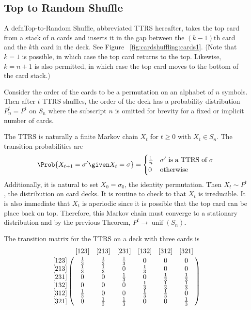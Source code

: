 \documentclass[12pt]{article}
\begin{document}
\subsection*{Top to Random Shuffle}

A defn{Top-to-Random Shuffle},%
abbreviated TTRS hereafter, takes the top card from a stack of \( n \)
cards and inserts it in the gap between the \( (k-1) \)th card and the \(
k \)th card in the deck.  See Figure~%
\ref{fig:cardshuffling:cards1}. (Note that \( k = 1 \) is possible, in
which case the top card returns to the top.  Likewise, \( k = n+1 \) is
also permitted, in which case the top card moves to the bottom of the
card stack.)

Consider the order of the cards to be a permutation on an alphabet of \(
n \) symbols.  Then after \( t \) TTRS shuffles, the order of the deck
has a probability distribution \( P^t_n = P^t \) on \( S_n \) where the
subscript \( n \) is omitted for brevity for a fixed or implicit number
of cards.

The TTRS is naturally a finite Markov chain \( X_t \) for \( t \ge 0 \)
with \( X_t \in S_n \).  The transition probabilities are
\[
    \Prob{X_{t+1} = \sigma' \given X_t = \sigma} =
    \begin{cases}
        \frac{1}{n}     & \text{\( \sigma' \) is a TTRS of \( \sigma \)}\\
        0       & \text{otherwise}
    \end{cases}
\] Additionally, it is natural to set \( X_0 = \sigma_0 \), the identity
permutation.  Then \( X_t \sim P^t \), the distribution on card decks.
It is routine to check to that \( X_t \) is irreducible.  It is also
immediate that \( X_t \) is aperiodic since it is possible that the top
card can be place back on top.  Therefore, this Markov chain must
converge to a stationary distribution and by the previous Theorem, \( P^t
\to
\operatorname{unif}
(S_n) \).

The transition matrix for the TTRS on a deck with three cards is
\[
    \bordermatrix{
        & [123] & [213] & [231] & [132] & [312] & [321] \cr
        [123]   & \frac{1}{3}   & \frac{1}{3}   & \frac{1}{3}   & 0
        & 0     & 0 \cr
        [213]   & \frac{1}{3}   & \frac{1}{3}   & 0     & \frac{1}{3}
        & 0     & 0 \cr
        [231]   & 0     & 0     & \frac{1}{3}   & 0     & \frac{1}{3}
        & \frac{1}{3} \cr
        [132]   & 0     & 0     & 0     & \frac{1}{3}   & \frac{1}{3}
        & \frac{1}{3} \cr
        [312]   & \frac{1}{3}   & 0     & 0     & \frac{1}{3}   & \frac{1}
        {3}     & 0 \cr
        [321]   & 0     & \frac{1}{3}   & \frac{1}{3}   & 0     & 0
        & \frac{1}{3} \cr
    }
\]
\end{document}
